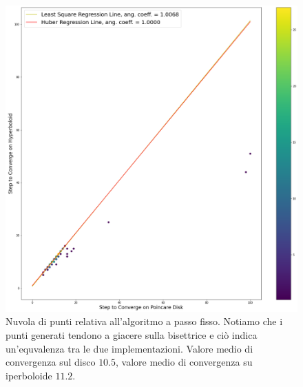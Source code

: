 \documentclass[a4paper, 12pt]{article}
\begin{document}
\begin{figure}[H] %
    \centering\includegraphics[width=1\textwidth]{fixed_step_size.png}
    \caption{Nuvola di punti relativa all'algoritmo a passo fisso. Notiamo che i punti generati tendono a giacere sulla bisettrice e ciò indica un'equvalenza tra le due implementazioni. Valore medio di convergenza sul disco $10.5$, valore medio di convergenza su iperboloide $11.2$.}
\end{figure}
\end{document}
